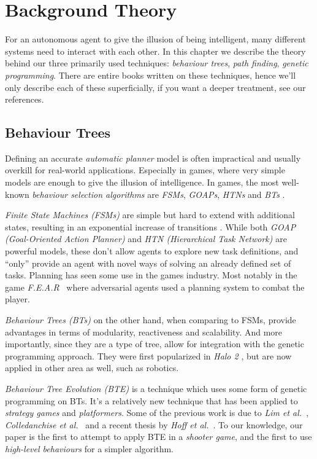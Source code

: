 \documentclass[a4paper, twocolumn]{article}
\begin{document}
    \section{Background Theory} \label{sec:background_theory}

    For an autonomous agent to give the illusion of being intelligent, many different systems need to interact with each other. In this chapter we describe the theory behind our three primarily used techniques: \emph{behaviour trees}, \emph{path finding}, \emph{genetic programming}. There are entire books written on these techniques, hence we'll only describe each of these superficially, if you want a deeper treatment, see our references.

        \subsection{Behaviour Trees} \label{sec:behaviour_trees}

        Defining an accurate \emph{automatic planner} model is often impractical and usually overkill for real-world applications. Especially in games, where very simple models are enough to give the illusion of intelligence. In games, the most well-known \emph{behaviour selection algorithms} are \emph{FSMs}, \emph{GOAPs}, \emph{HTNs} and \emph{BTs} \cite{dawe2014overview}.

        \emph{Finite State Machines (FSMs)} are simple but hard to extend with additional states, resulting in an exponential increase of transitions \cite{dawe2014overview}. While both \emph{GOAP (Goal-Oriented Action Planner)} and \emph{HTN (Hierarchical Task Network)} are powerful models, these don't allow agents to explore new task definitions, and ``only'' provide an agent with novel ways of solving an already defined set of tasks. Planning has seen some use in the games industry. Most notably in the game \textit{F.E.A.R}~\cite{orkin2006three} where adversarial agents used a planning system to combat the player.

        \emph{Behaviour Trees (BTs)} on the other hand, when comparing to FSMs, provide advantages in terms of modularity, reactiveness and scalability. And more importantly, since they are a type of tree, allow for integration with the genetic programming approach. They were first popularized in \emph{Halo 2} \cite{isla2005managing}, but are now applied in other area as well, such as robotics.

        \emph{Behaviour Tree Evolution (BTE)} is a technique which uses some form of genetic programming on BTs. It's a relatively new technique that has been applied to \emph{strategy games} and \emph{platformers}. Some of the previous work is due to \emph{Lim et al.}~\cite{lim2010evolving}, \emph{Colledanchise et al.}~\cite{colledanchise2015learning} and a recent thesis by \emph{Hoff et al.}~\cite{hoff2016evolving}. To our knowledge, our paper is the first to attempt to apply BTE in a \emph{shooter game}, and the first to use \emph{high-level behaviours} for a simpler algorithm.
\end{document}
